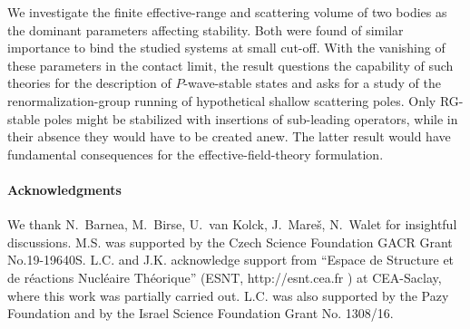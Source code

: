 \documentclass[aps,prl,onecolumn,groupedaddress,superscriptaddress]
{revtex4}
\begin{document}
We investigate the finite effective-range and scattering volume of two bodies 
as the dominant parameters affecting stability. 
Both were found of similar importance to bind the studied systems at small cut-off.
With the vanishing of these parameters in the contact limit,
the result questions the capability of such theories for the description of $P$-wave-stable states
and asks for a study of the renormalization-group running of hypothetical shallow scattering poles. 
Only RG-stable poles might be stabilized with insertions of sub-leading operators,
while in their absence they would have to be created anew.
The latter result would have fundamental consequences for the effective-field-theory formulation.

\paragraph*{Acknowledgments}
We thank N.~Barnea,  M.~Birse, U.~van Kolck, J.~Mare\v{s}, N.~Walet for insightful
discussions.
M.S. was supported by the Czech Science Foundation GACR Grant No.19-19640S.
L.C. and J.K. acknowledge support from ``Espace de Structure et de r\'eactions
Nucl\'eaire Th\'eorique''  (ESNT, http://esnt.cea.fr )  at CEA-Saclay, where this work
was partially carried out.
L.C. was also supported by the Pazy Foundation and by the
Israel Science Foundation Grant No. 1308/16.




\end{document}
